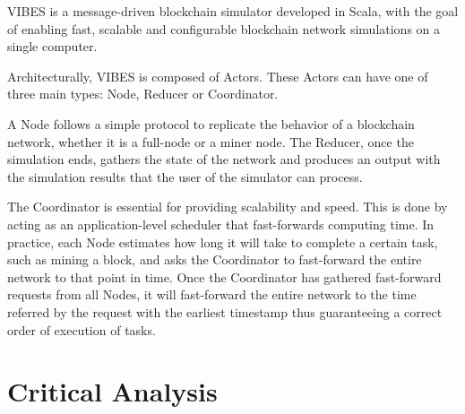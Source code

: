 VIBES \cite{vibes} is a message-driven blockchain simulator developed in Scala, with the goal of enabling fast, scalable and configurable blockchain network simulations on a single computer.

Architecturally, VIBES is composed of Actors. These Actors can have one of three main types: Node, Reducer or Coordinator.

A Node follows a simple protocol to replicate the behavior of a blockchain network, whether it is a full-node or a miner node. The Reducer, once the simulation ends, gathers the state of the network and produces an output with the simulation results that the user of the simulator can process.

The Coordinator is essential for providing scalability and speed. This is done by acting as an application-level scheduler that fast-forwards computing time. In practice, each Node estimates how long it will take to complete a certain task, such as mining a block, and asks the Coordinator to fast-forward the entire network to that point in time. Once the Coordinator has gathered fast-forward requests from all Nodes, it will fast-forward the entire network to the time referred by the request with the earliest timestamp thus guaranteeing a correct order of execution of tasks.


\section{Critical Analysis}
\label{sec:critical_analysis}


